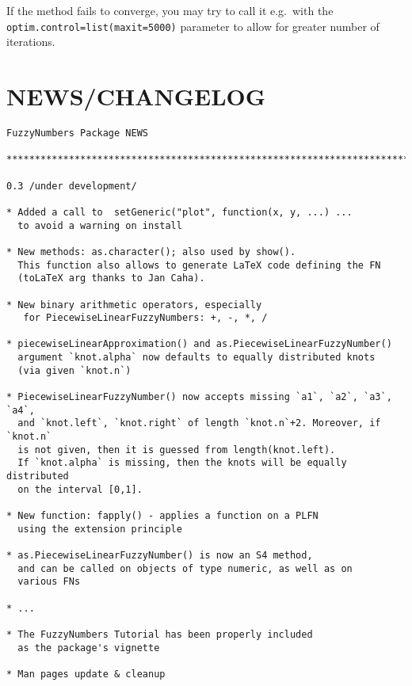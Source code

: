 \documentclass[11pt]{article}\usepackage{graphicx, color}
\makeatletter
\newenvironment{kframe}{%
 \def\at@end@of@kframe{}%
 \ifinner\ifhmode%
  \def\at@end@of@kframe{\end{minipage}}%
  \begin{minipage}{\columnwidth}%
 \fi\fi%
 \def\FrameCommand##1{\hskip\@totalleftmargin \hskip-\fboxsep
 \colorbox{shadecolor}{##1}\hskip-\fboxsep
     \hskip-\linewidth \hskip-\@totalleftmargin \hskip\columnwidth}%
 \MakeFramed {\advance\hsize-\width
   \@totalleftmargin\z@ \linewidth\hsize
   \@setminipage}}%
 {\par\unskip\endMakeFramed%
 \at@end@of@kframe}
\newenvironment{knitrout}{}{} %
\makeatother
\begin{document}
If the method fails to converge, you may try to call it
e.g.~with the \texttt{optim.control=list(maxit=\allowbreak{}5000)} parameter
to allow for greater number of iterations.









\section{NEWS/CHANGELOG}

\begin{knitrout}\small
{}\color{fgcolor}\begin{kframe}
\begin{verbatim}
FuzzyNumbers Package NEWS

***************************************************************************

0.3 /under development/

* Added a call to  setGeneric("plot", function(x, y, ...) ...
  to avoid a warning on install

* New methods: as.character(); also used by show().
  This function also allows to generate LaTeX code defining the FN
  (toLaTeX arg thanks to Jan Caha).

* New binary arithmetic operators, especially
   for PiecewiseLinearFuzzyNumbers: +, -, *, /

* piecewiseLinearApproximation() and as.PiecewiseLinearFuzzyNumber()
  argument `knot.alpha` now defaults to equally distributed knots
  (via given `knot.n`)

* PiecewiseLinearFuzzyNumber() now accepts missing `a1`, `a2`, `a3`, `a4`,
  and `knot.left`, `knot.right` of length `knot.n`+2. Moreover, if `knot.n`
  is not given, then it is guessed from length(knot.left).
  If `knot.alpha` is missing, then the knots will be equally distributed
  on the interval [0,1].

* New function: fapply() - applies a function on a PLFN
  using the extension principle

* as.PiecewiseLinearFuzzyNumber() is now an S4 method,
  and can be called on objects of type numeric, as well as on
  various FNs

* ...

* The FuzzyNumbers Tutorial has been properly included
  as the package's vignette

* Man pages update & cleanup


\end{verbatim}
\end{kframe}
\end{knitrout}
\end{document}
